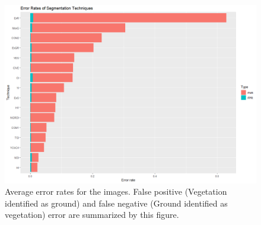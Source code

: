 \documentclass[letterpaper]{report}
\begin{document}
{%
\begin{figure}[h]
	\centering
	\includegraphics[width=.75\linewidth]{figures/segmentation-error-rates.png}
	\caption[Error rates of segmentation algorithms]{Average error rates for the images. False positive (Vegetation identified as ground) and false negative (Ground identified as vegetation) error are summarized by this figure. }
	\label{fig:segmentation-errors}
\end{figure}

}
\end{document}

